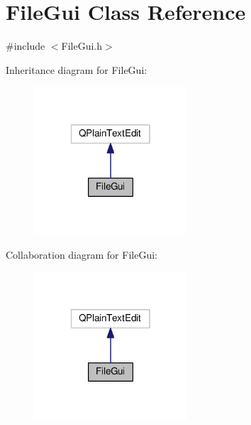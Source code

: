 \hypertarget{class_file_gui}{\section{File\-Gui Class Reference}
\label{class_file_gui}
}


{\ttfamily \#include $<$File\-Gui.\-h$>$}



Inheritance diagram for File\-Gui\-:\nopagebreak
\begin{figure}[H]
\begin{center}
\leavevmode
\includegraphics[width=162pt]{class_file_gui__inherit__graph}
\end{center}
\end{figure}


Collaboration diagram for File\-Gui\-:\nopagebreak
\begin{figure}[H]
\begin{center}
\leavevmode
\includegraphics[width=162pt]{class_file_gui__coll__graph}
\end{center}
\end{figure}
